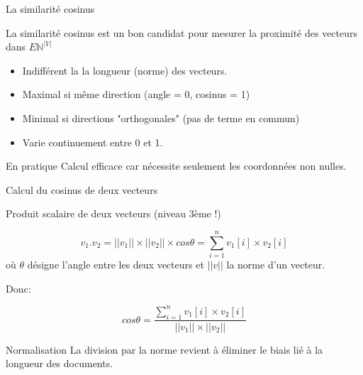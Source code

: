 \begin{frame}{La similarité cosinus}

La \alert{similarité cosinus} est un bon candidat pour mesurer la proximité des
vecteurs dans $E\mathbb{N}^{|V|}$


\vfill

\begin{itemize}
  \item Indifférent la la \alert{longueur} (norme) des vecteurs.
  \item Maximal si même direction (angle = 0, cosinus = 1)
  \item Minimal si directions "orthogonales" (pas de terme en commun)
  \item Varie continuement entre 0 et 1.
  
\end{itemize}

\begin{block}{En pratique}
Calcul efficace car nécessite seulement les coordonnées non nulles.
\end{block}
\end{frame}


\begin{frame}{Calcul du cosinus de deux vecteurs}

Produit scalaire de deux vecteurs (niveau 3ème !)

\[
    v_1 . v_2  = ||v_1|| \times ||v_2|| \times cos \theta = \sum_{i=1}^n v_1[i] \times v_2[i]
\]
où $\theta$ désigne l'angle entre les deux vecteurs et $||v||$ la norme d'un vecteur.

\vfill

Donc:

\[
   cos { } \theta  = \frac{\sum_{i=1}^n v_1[i] \times v_2[i]}{||v_1|| \times ||v_2||}
\]

\begin{block}{Normalisation}
La division par la norme revient à éliminer le biais lié à la longueur des documents.
\end{block}
\end{frame}


